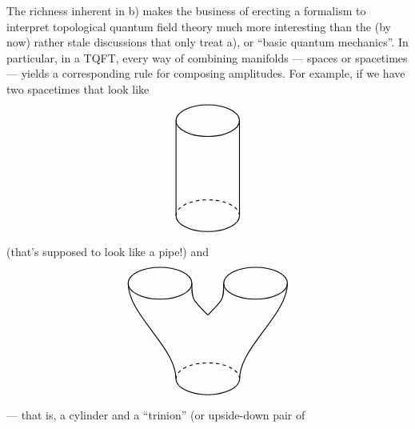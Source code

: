\documentclass{article}
\begin{document}
The richness inherent in b) makes the business of erecting a formalism
to interpret topological quantum field theory much more interesting than
the (by now) rather stale discussions that only treat a), or ``basic
quantum mechanics''. In particular, in a TQFT, every way of combining
manifolds --- spaces or spacetimes --- yields a corresponding rule for
composing amplitudes. For example, if we have two spacetimes that look
like \[
  \begin{tikzpicture}[scale=0.5]
    \draw[thick] (0,0) ellipse (2cm and 1cm);
    \draw[thick] (-2,0) to (-2,-6);
    \draw[thick] (2,0) to (2,-6);
    \begin{scope}[shift={(0,-6)}]
      \draw[thick,dashed] (0:2) arc (0:180:2cm and 1cm);
      \draw[thick] (180:2) arc (180:360:2cm and 1cm);
    \end{scope}
  \end{tikzpicture}
\] (that's supposed to look like a pipe!) and \[
  \begin{tikzpicture}[scale=0.5]
    \draw[thick] (-3,0) ellipse (2cm and 1cm);
    \draw[thick] (3,0) ellipse (2cm and 1cm);
    \draw[thick] (-5,0) .. controls (-5,-2) and (-2,-4) .. (-2,-6);
    \draw[thick] (5,0) .. controls (5,-2) and (2,-4) .. (2,-6);
    \draw[thick] (-1,0) .. controls (-1,-1) .. (0,-2);
    \draw[thick] (1,0) .. controls (1,-1) .. (0,-2);
    \begin{scope}[shift={(0,-6)}]
      \draw[thick,dashed] (0:2) arc (0:180:2cm and 1cm);
      \draw[thick] (180:2) arc (180:360:2cm and 1cm);
    \end{scope}
  \end{tikzpicture}
\] --- that is, a cylinder and a ``trinion'' (or upside-down pair of
\end{document}
